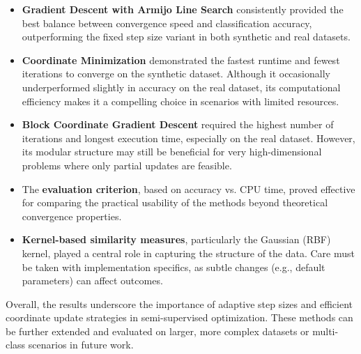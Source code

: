 \documentclass{article}
\begin{document}
\begin{itemize}
    \item \textbf{Gradient Descent with Armijo Line Search} consistently provided the best balance between convergence speed and classification accuracy, outperforming the fixed step size variant in both synthetic and real datasets.
    
    \item \textbf{Coordinate Minimization} demonstrated the fastest runtime and fewest iterations to converge on the synthetic dataset. Although it occasionally underperformed slightly in accuracy on the real dataset, its computational efficiency makes it a compelling choice in scenarios with limited resources.
    
    \item \textbf{Block Coordinate Gradient Descent} required the highest number of iterations and longest execution time, especially on the real dataset. However, its modular structure may still be beneficial for very high-dimensional problems where only partial updates are feasible.
    
    \item The \textbf{evaluation criterion}, based on accuracy vs. CPU time, proved effective for comparing the practical usability of the methods beyond theoretical convergence properties.
    
    \item \textbf{Kernel-based similarity measures}, particularly the Gaussian (RBF) kernel, played a central role in capturing the structure of the data. Care must be taken with implementation specifics, as subtle changes (e.g., default parameters) can affect outcomes.

\end{itemize}

\noindent Overall, the results underscore the importance of adaptive step sizes and efficient coordinate update strategies in semi-supervised optimization. These methods can be further extended and evaluated on larger, more complex datasets or multi-class scenarios in future work.
\end{document}
